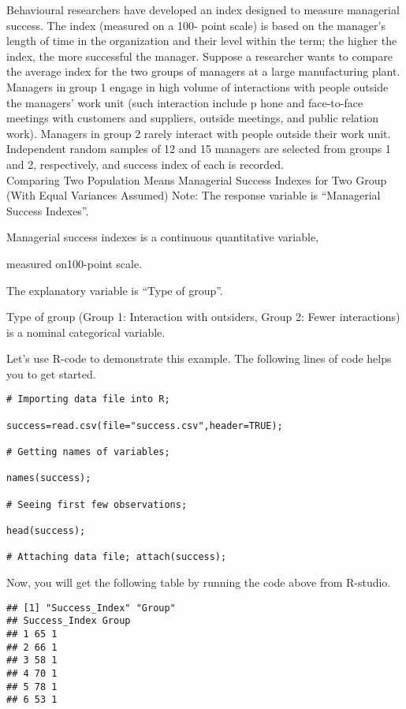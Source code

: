 \begin{example}
Behavioural researchers have developed an index designed to measure managerial success. The index (measured on a 100- point scale) is based on the manager’s length of time in the organization and their level within the term; the higher the index, the more successful the manager. Suppose a researcher wants to compare the average index for the two groups of managers at a large manufacturing plant. Managers in group 1 engage in high volume of interactions with people outside the managers’ work unit (such interaction include p hone and face-to-face meetings with customers and suppliers, outside meetings, and public relation work). Managers in group 2 rarely interact with people outside their work unit. Independent random samples of 12 and 15 managers are selected from groups 1 and 2, respectively, and success index of each is recorded.\\
Comparing Two Population Means Managerial Success Indexes for Two Group (With Equal Variances Assumed) Note: The response variable is “Managerial Success Indexes”.

Managerial success indexes is a continuous quantitative variable,

measured on100-point scale.

The explanatory variable is “Type of group”.

Type of group (Group 1: Interaction with outsiders, Group 2: Fewer interactions) is a nominal categorical variable.

Let's use R-code to demonstrate this example. The following lines of code helps you to get started.

\begin{tcolorbox}[colback=gray!10, colframe=gray!50, arc=2mm]
\begin{verbatim}
# Importing data file into R;

success=read.csv(file="success.csv",header=TRUE);

# Getting names of variables;

names(success);

# Seeing first few observations;

head(success);

# Attaching data file; attach(success);
\end{verbatim}
\end{tcolorbox}

Now, you will get the following table by running the code above from R-studio.

\begin{tcolorbox}[colback=gray!10, colframe=gray!50, arc=2mm]
\begin{verbatim}
## [1] "Success_Index" "Group" 
## Success_Index Group 
## 1 65 1 
## 2 66 1 
## 3 58 1 
## 4 70 1 
## 5 78 1 
## 6 53 1
\end{verbatim}
\end{tcolorbox}


\end{example}
